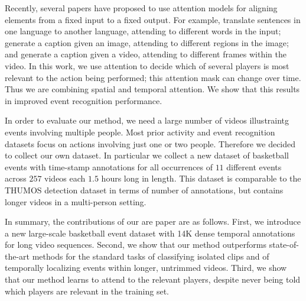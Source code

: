 Recently, several papers have proposed to use attention models
 for aligning
elements from a fixed input to a fixed output.
For example, \cite{Bahdnau_arxiv14}
translate sentences in one language to another language, attending to different
words in the input;
\cite{Xu_arxiv15} generate a caption given an image, attending to
different regions in the image;
and  \cite{Yao_arxiv15} generate a caption given a video, attending to
different frames within the video.
In this work, we use attention to decide which of several players is
most relevant to the action being performed; this attention mask can
change over time. Thus we are combining
spatial and temporal attention. We show that this results in improved
event recognition performance.

In order to evaluate our method, we need a large number of videos illustraintg
events involving multiple people. Most prior activity and event
recognition datasets focus on actions involving just one or two people.
Therefore we decided to collect our own dataset.
In particular we collect a new dataset of basketball events with time-stamp annotations for
all occurrences of $11$ different events across $257$ videos each $1.5$ hours
long in length.  This dataset is comparable to the THUMOS \cite{THUMOS}
detection dataset in terms of number of annotations, but contains longer videos
in a multi-person setting.


In summary, the contributions of our are paper are as follows.  First, we
introduce a new  large-scale basketball event dataset with 14K dense temporal
annotations for long video sequences.  Second, we show that our method
outperforms state-of-the-art methods for the standard tasks of classifying
isolated clips and of temporally localizing events within longer, untrimmed
videos.  Third, we show that our method learns to attend to the relevant
players, despite never being told which players are relevant in the training
set.



